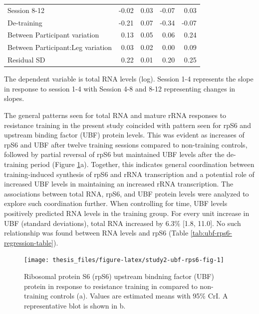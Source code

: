 \documentclass[twoside,10pt]{gihclass} %
\begin{document}
\begin{table}
\begin{threeparttable}
\begin{tabular}[t]{lrrrr}
\hspace{1em}Session 8-12 & -0.02 & 0.03 & -0.07 & 0.03\\
\hspace{1em}De-training & -0.21 & 0.07 & -0.34 & -0.07\\
\hspace{1em}Between Participant variation & 0.13 & 0.05 & 0.06 & 0.24\\
\hspace{1em}Between Participant:Leg variation & 0.03 & 0.02 & 0.00 & 0.09\\
\hspace{1em}Residual SD & 0.22 & 0.01 & 0.20 & 0.25\\
\bottomrule
\end{tabular}
\begin{tablenotes}[para]
\item The dependent variable is total RNA levels (log). Session 1-4 represents the slope in response to session 1-4 with Session 4-8 and 8-12 representing changes in slopes.
\end{tablenotes}
\end{threeparttable}
\end{table}
The general patterns seen for total RNA and mature rRNA responses to resistance training in the present study coincided with pattern seen for rpS6 and upstream binding factor (UBF) protein levels. This was evident as increases of rpS6 and UBF after twelve training sessions compared to non-training controls, followed by partial reversal of rpS6 but maintained UBF levels after the de-training period
(Figure \ref{fig:study2-ubf-rps6-fig}a).
Together, this indicates general coordination between training-induced synthesis of rpS6 and rRNA transcription and a potential role of increased UBF levels in maintaining an increased rRNA transcription.
The associations between total RNA, rpS6, and UBF protein levels were analyzed to explore such coordination further. When controlling for time, UBF levels positively predicted RNA levels in the training group. For every unit increase in UBF (standard deviations), total RNA increased by 6.3\% {[}1.8, 11.0{]}. No such relationship was found between RNA levels and rpS6 (Table \ref{tab:ubf-rps6-regression-table}).
\begin{figure}

{\centering \texttt{[image: thesis\_files/figure-latex/study2-ubf-rps6-fig-1]} 

}

\caption[UBF and rpS6 protein in resposne to resistance training in Study II.]{Ribosomal protein S6 (rpS6) upstream bindning factor (UBF) protein in response to resistance training in compared to non-training controls (a). Values are estimated means with 95\% CrI. A representative blot is shown in b.}\label{fig:study2-ubf-rps6-fig}
\end{figure}
\end{document}
